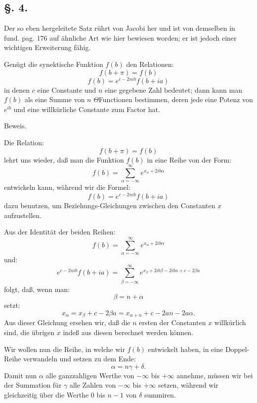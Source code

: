 \documentclass[10pt]{article}
\newcommand{\sourceanchor}[1]{\hypertarget{source-#1}{}}
\begin{document}
\subsection*{\S. 4.}
Der so eben hergeleitete Satz rührt von Jacobi her und ist von demselben in fund. pag. 176 auf ähnliche Art wie hier bewiesen worden; er ist jedoch einer wichtigen Erweiterung fähig.

Genügt die synektische Funktion \(f(b)\) den Relationen:
\[
f(b+\pi)=f(b)
\]
\[
f(b)=e^{c-2nib}f(b+ia)
\]
in denen \(c\) eine Constante und \(n\) eine gegebene Zahl bedeutet; dann kann man \(f(b)\) als eine Summe von \(n\) \(\Theta\)Functionen bestimmen, deren jede eine Potenz von \(e^{ib}\) und eine willkürliche Constante zum Factor hat.

\begin{center}Beweis.\end{center}
Die Relation:
\[
f(b+\pi)=f(b)
\]
lehrt uns wieder, daß man die Funktion \(f(b)\) in eine Reihe von der Form:
\sourceanchor{PA05}
\begin{equation*}
 f(b)=\sum_{\alpha=-\infty}^{\infty}e^{x_{\alpha}+2ib\alpha}
\tag{1}
\end{equation*}
entwickeln kann, während wir die Formel:
\[
f(b)=e^{c-2nib}f(b+ia)
\]
dazu benutzen, um Beziehungs-Gleichungen zwischen den Constanten \(x\) aufzustellen.

Aus der Identität der beiden Reihen:
\[
f(b)=\sum_{\alpha=-\infty}^{\infty}e^{x_{\alpha}+2ib\alpha}
\]
und:
\[
e^{c-2nib}f(b+ia)=\sum_{\beta=-\infty}^{\infty}e^{x_{\beta}+2ib\beta-2ibn+c-2\beta a}
\]
folgt, daß, wenn man:
\[
\beta=n+\alpha
\]
setzt:
\[
x_{\alpha}=x_{\beta}+c-2\beta a=x_{\alpha+n}+c-2an-2a\alpha.
\]
Aus dieser Gleichung ersehen wir, daß die \(n\) ersten der Constanten \(x\) willkürlich sind, die übrigen \(x\) indeß aus diesen berechnet werden können.

Wir wollen nun die Reihe, in welche wir \(f(b)\) entwickelt haben, in eine Doppel-Reihe verwandeln und setzen zu dem Ende:
\[
\alpha=n\gamma+\delta.
\]
Damit nun \(\alpha\) alle ganzzahligen Werthe von \(-\infty\) bis \(+\infty\) annehme, müssen wir bei der Summation für \(\gamma\) alle Zahlen von \(-\infty\) bis \(+\infty\) setzen, während wir gleichzeitig über die Werthe 0 bis \(n-1\) von \(\delta\) summiren.
\end{document}
